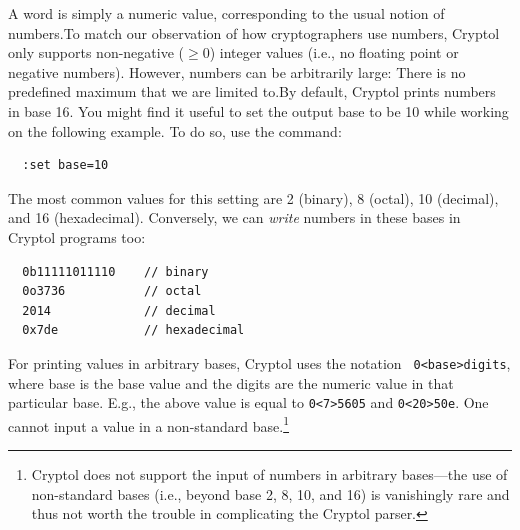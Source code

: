 A word is simply a numeric value, corresponding to the usual notion of
numbers.\indTheWordType To match our observation of how cryptographers
use numbers, Cryptol only supports non-negative ($\geq 0$) integer
values (i.e., no floating point or negative numbers).\indFloatingPoint
However, numbers can be arbitrarily large: There is no predefined
maximum that we are limited to.\indArbitraryPrecision By default,
Cryptol prints numbers in base 16. You might find it useful to set the
output base to be 10 while working on the following example. To do so,
use the command:\indSettingBase
\begin{Verbatim}
  :set base=10
\end{Verbatim}
The most common values for this setting are 2 (binary), 8 (octal), 10
(decimal), and 16 (hexadecimal).  Conversely, we can \emph{write}
numbers in these bases in Cryptol programs too:
\begin{Verbatim}
  0b11111011110    // binary
  0o3736           // octal
  2014             // decimal
  0x7de            // hexadecimal
\end{Verbatim}

For printing values in arbitrary bases, Cryptol uses the notation {\tt
  0<base>digits}, where base is the base value and the digits are the
numeric value in that particular base.  E.g., the above value is equal
to \texttt{0<7>5605} and \texttt{0<20>50e}.  One cannot input a value
in a non-standard base.\footnote{Cryptol does not support the input of
  numbers in arbitrary bases---the use of non-standard bases (i.e.,
  beyond base 2, 8, 10, and 16) is vanishingly rare and thus not worth
  the trouble in complicating the Cryptol parser.}



